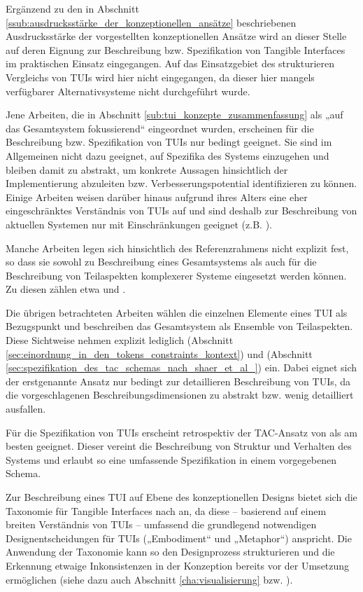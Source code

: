Ergänzend zu den in Abschnitt \ref{ssub:ausdrucksstärke_der_konzeptionellen_ansätze} beschriebenen Ausdrucksstärke der vorgestellten konzeptionellen Ansätze wird an dieser Stelle auf deren Eignung zur Beschreibung bzw. Spezifikation von Tangible Interfaces im praktischen Einsatz eingegangen. Auf das Einsatzgebiet des strukturieren Vergleichs von \glspl{TUI} wird hier nicht eingegangen, da dieser hier mangels verfügbarer Alternativsysteme nicht durchgeführt wurde.

Jene Arbeiten, die in Abschnitt \ref{sub:tui_konzepte_zusammenfassung} als „auf das Gesamtsystem fokussierend“ eingeordnet wurden, erscheinen für die Beschreibung bzw. Spezifikation von \glspl{TUI} nur bedingt geeignet. Sie sind im Allgemeinen nicht dazu geeignet, auf Spezifika des Systems einzugehen und bleiben damit zu abstrakt, um konkrete Aussagen hinsichtlich der Implementierung abzuleiten bzw. Verbesserungspotential identifizieren zu können. Einige Arbeiten weisen darüber hinaus aufgrund ihres Alters eine eher eingeschränktes Verständnis von \glspl{TUI} auf und sind deshalb zur Beschreibung von aktuellen Systemen nur mit Einschränkungen geeignet (z.B. \citep{Fitzmaurice96}).

Manche Arbeiten legen sich hinsichtlich des Referenzrahmens nicht explizit fest, so dass sie sowohl zu Beschreibung eines Gesamtsystems als auch für die Beschreibung von Teilaspekten komplexerer Systeme eingesetzt werden können. Zu diesen zählen etwa \citep{Koleva03} und \citet{Fishkin04}.

Die übrigen betrachteten Arbeiten wählen die einzelnen Elemente eines \gls{TUI} als Bezugspunkt und beschreiben das Gesamtsystem als Ensemble von Teilaspekten. Diese Sichtweise nehmen explizit lediglich \citep{Ullmer05} (Abschnitt \ref{sec:einordnung_in_den_tokens_constraints_kontext}) und \citep{Shaer04} (Abschnitt \ref{sec:spezifikation_des_tac_schemas_nach_shaer_et_al_}) ein. Dabei eignet sich der erstgenannte Ansatz nur bedingt zur detaillieren Beschreibung von \glspl{TUI}, da die vorgeschlagenen Beschreibungsdimensionen zu abstrakt bzw. wenig detailliert ausfallen.

Für die Spezifikation von \glspl{TUI} erscheint retrospektiv der TAC-Ansatz von \citet{Shaer04} als am besten geeignet. Dieser vereint die Beschreibung von Struktur und Verhalten des Systems und erlaubt so eine umfassende Spezifikation in einem vorgegebenen Schema. 

Zur Beschreibung eines \gls{TUI} auf Ebene des konzeptionellen Designs bietet sich die Taxonomie für Tangible Interfaces nach \citet{Fishkin04} an, da diese -- basierend auf einem breiten Verständnis von \glspl{TUI} -- umfassend die grundlegend notwendigen Designentscheidungen für \glspl{TUI} („Embodiment“ und „Metaphor“) anspricht. Die Anwendung der Taxonomie kann so den Designprozess strukturieren und die Erkennung etwaige Inkonsistenzen in der Konzeption bereits vor der Umsetzung ermöglichen (siehe dazu auch Abschnitt \ref{cha:visualisierung} bzw. \citep{Oppl09d}). 

